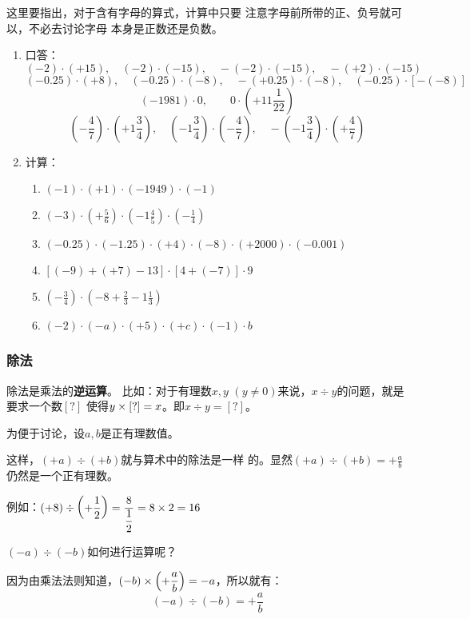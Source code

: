 这里要指出，对于含有字母的算式，计算中只要
注意字母前所带的正、负号就可以，不必去讨论字母
本身是正数还是负数。

\begin{ex}
\begin{enumerate}
    \item 口答：
    \[(-2)\cdot (+15),\quad (-2)\cdot (-15),\quad -(-2)\cdot (-15),\quad -(+2)\cdot (-15)\]
\[(-0.25)\cdot (+8),\quad (-0.25)\cdot (-8),\quad -(+0.25)\cdot (-8),\quad(-0.25)\cdot [-(-8)] \]
\[(-1981)\cdot 0,\qquad 0\cdot\left(+11\frac{1}{22}\right)\]
\[\left(-\frac{4}{7}\right)\cdot \left(+1\frac{3}{4}\right),\quad \left(-1\frac{3}{4}\right)\cdot\left(-\frac{4}{7}\right),\quad -\left(-1\frac{3}{4}\right)\cdot\left(+\frac{4}{7}\right)\]

\item 计算：
\begin{enumerate}
    \item $(-1)\cdot(+1)\cdot (-1949)\cdot (-1)$
    \item $(-3)\cdot \left(+\frac{5}{6}\right)\cdot \left(-1\frac{4}{5}\right)\cdot\left(-\frac{1}{4}\right)$
    \item $(-0.25)\cdot (-1.25)\cdot (+4)\cdot (-8)\cdot (+2000)\cdot (-0.001)$
    \item $[(-9)+(+7)-13]\cdot [4+(-7)]\cdot 9$
    \item $\left(-\frac{3}{4}\right)\cdot \left(-8+\frac{2}{3}-1\frac{1}{3}\right)$
    \item $(-2)\cdot (-a)\cdot (+5)\cdot (+c)\cdot (-1)\cdot b$
\end{enumerate}
\end{enumerate}    
\end{ex}

\subsubsection{除法}
除法是乘法的\textbf{逆运算}。 比如：对于有理数$x,  y$
 $(y\ne 0)$来说，$x\div y$的问题，就是要求一个数$[?]$
使得$y\times[?]=x$。即$x\div y=[?]$。

为便于讨论，设$a,b$是正有理数值。

这样，$(+a) \div (+b)$就与算术中的除法是一样
的。显然$(+a)\div (+b)=+\frac{a}{b}$仍然是一个正有理数。
                    
例如：$(+8)\div\left(+\dfrac{1}{2}\right)=\dfrac{8}{\dfrac{1}{2}}=8\times 2=16$

$(-a) \div (-b)$如何进行运算呢？

因为由乘法法则知道，$(-b)\times \left(+\dfrac{a}{b}\right)=-a$，所以就有：
\[(-a) \div (-b)=+\frac{a}{b}\]

